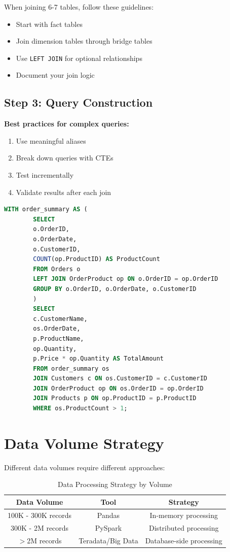 \documentclass{article}
\begin{document}
	When joining 6-7 tables, follow these guidelines:
	
	\begin{itemize}
		\item Start with fact tables
		\item Join dimension tables through bridge tables
		\item Use \texttt{LEFT JOIN} for optional relationships
		\item Document your join logic
	\end{itemize}
	
	\subsection{Step 3: Query Construction}
	
	\textbf{Best practices for complex queries:}
	
	\begin{enumerate}
		\item Use meaningful aliases
		\item Break down queries with CTEs
		\item Test incrementally
		\item Validate results after each join
	\end{enumerate}
	
	\begin{lstlisting}[language=SQL, caption=Multi-table Join Example]
		WITH order_summary AS (
		SELECT 
		o.OrderID,
		o.OrderDate,
		o.CustomerID,
		COUNT(op.ProductID) AS ProductCount
		FROM Orders o
		LEFT JOIN OrderProduct op ON o.OrderID = op.OrderID
		GROUP BY o.OrderID, o.OrderDate, o.CustomerID
		)
		SELECT 
		c.CustomerName,
		os.OrderDate,
		p.ProductName,
		op.Quantity,
		p.Price * op.Quantity AS TotalAmount
		FROM order_summary os
		JOIN Customers c ON os.CustomerID = c.CustomerID
		JOIN OrderProduct op ON os.OrderID = op.OrderID
		JOIN Products p ON op.ProductID = p.ProductID
		WHERE os.ProductCount > 1;
	\end{lstlisting}
	
	\section{Data Volume Strategy}
	
	Different data volumes require different approaches:
	
	\begin{table}[h]
		\centering
		\begin{tabular}{|c|c|c|}
			\hline
			\textbf{Data Volume} & \textbf{Tool} & \textbf{Strategy} \\
			\hline
			100K - 300K records & Pandas & In-memory processing \\
			300K - 2M records & PySpark & Distributed processing \\
			$>$2M records & Teradata/Big Data & Database-side processing \\
			\hline
		\end{tabular}
		\caption{Data Processing Strategy by Volume}
		\label{tab:volumes}
	\end{table}
	
\end{document}
